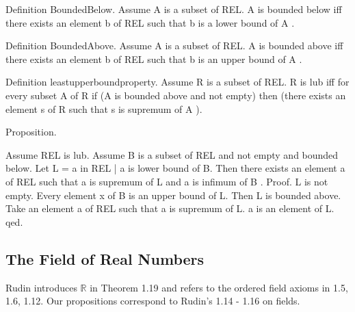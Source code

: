 \documentclass{article}
\newenvironment{forthel}{\begin{leftbar}}{\end{leftbar}}
\newcommand{\RR}{\mathbb{R}}
\begin{document}
\begin{forthel}
Definition BoundedBelow.
Assume A is a subset of REL.
A is bounded below  iff 
there exists an element b of REL such that b is a lower bound of A .

Definition BoundedAbove.
Assume A is a subset of REL.
A is bounded above  iff 
there exists an element b of REL such that b is an upper bound of A .

Definition leastupperboundproperty.
Assume R is a subset of REL.
R is lub iff for every subset A of R
if (A is bounded above and not empty) then (there exists an element s of R such that s is supremum of A ).

Proposition.

Assume REL is lub.
Assume B is a subset of REL and not empty and bounded below.
Let L = {a in REL | a is lower bound of B}.
Then there exists an element a of REL such that a is supremum of L and a is infimum of B .
Proof.
L is not empty.
Every element x of B is an upper bound of L.
Then L is bounded above.
Take an element a of REL such that a is supremum of L.
a is an element of L.
qed.




\end{forthel}

\subsection{The Field of Real Numbers}

Rudin introduces $\RR$ in Theorem 1.19 and refers to the ordered field 
axioms in 1.5, 1.6, 1.12. Our propositions correspond to Rudin's 1.14 - 1.16 on fields. 
\end{document}

